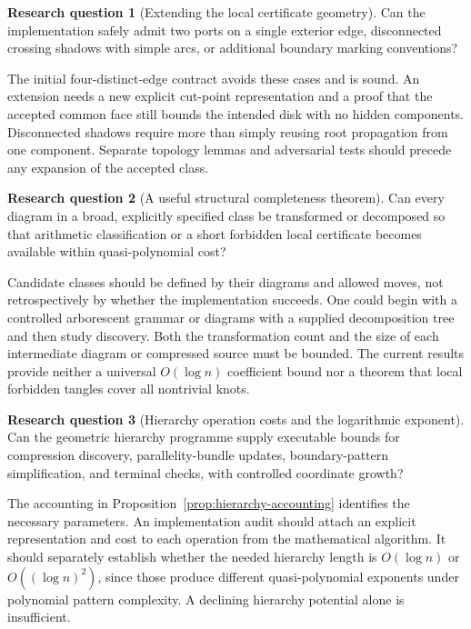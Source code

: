 \documentclass[11pt,a4paper]{article}
\theoremstyle{definition}
\newtheorem{researchquestion}{Research question}
\theoremstyle{remark}
\numberwithin{equation}{section}
\begin{document}
\begin{researchquestion}[Extending the local certificate geometry]
Can the implementation safely admit two ports on a single exterior edge,
disconnected crossing shadows with simple arcs, or additional boundary
marking conventions?
\end{researchquestion}
The initial four-distinct-edge contract avoids these cases and is sound.
An extension needs a new explicit cut-point representation and a proof
that the accepted common face still bounds the intended disk with no
hidden components. Disconnected shadows require more than simply
reusing root propagation from one component. Separate topology lemmas
and adversarial tests should precede any expansion of the accepted class.

\begin{researchquestion}[A useful structural completeness theorem]
Can every diagram in a broad, explicitly specified class be transformed
or decomposed so that arithmetic classification or a short forbidden
local certificate becomes available within quasi-polynomial cost?
\end{researchquestion}
Candidate classes should be defined by their diagrams and allowed moves,
not retrospectively by whether the implementation succeeds.
One could begin with a controlled arborescent grammar or diagrams with
a supplied decomposition tree and then study discovery.
Both the transformation count and the size of each intermediate diagram
or compressed source must be bounded. The current results provide
neither a universal \(O(\log n)\) coefficient bound nor a theorem that
local forbidden tangles cover all nontrivial knots.

\begin{researchquestion}[Hierarchy operation costs and the logarithmic exponent]
Can the geometric hierarchy programme supply executable bounds for
compression discovery, parallelity-bundle updates, boundary-pattern
simplification, and terminal checks, with controlled coordinate growth?
\end{researchquestion}
The accounting in Proposition~\ref{prop:hierarchy-accounting} identifies
the necessary parameters. An implementation audit should attach an
explicit representation and cost to each operation from the mathematical
algorithm. It should separately establish whether the needed hierarchy
length is \(O(\log n)\) or \(O((\log n)^2)\), since those produce
different quasi-polynomial exponents under polynomial pattern complexity.
A declining hierarchy potential alone is insufficient.
\end{document}
